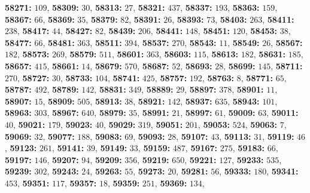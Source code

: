 \textsf{\bfseries 58271:} $109$, \textsf{\bfseries 58309:} $30$, \textsf{\bfseries 58313:} $27$, \textsf{\bfseries 58321:} $437$, \textsf{\bfseries 58337:} $193$, \textsf{\bfseries 58363:} $159$, \textsf{\bfseries 58367:} $66$, \textsf{\bfseries 58369:} $35$, \textsf{\bfseries 58379:} $82$, \textsf{\bfseries 58391:} $26$, \textsf{\bfseries 58393:} $73$, \textsf{\bfseries 58403:} $263$, \textsf{\bfseries 58411:} $238$, \textsf{\bfseries 58417:} $44$, \textsf{\bfseries 58427:} $82$, \textsf{\bfseries 58439:} $206$, \textsf{\bfseries 58441:} $148$, \textsf{\bfseries 58451:} $120$, \textsf{\bfseries 58453:} $38$, \textsf{\bfseries 58477:} $66$, \textsf{\bfseries 58481:} $363$, \textsf{\bfseries 58511:} $394$, \textsf{\bfseries 58537:} $270$, \textsf{\bfseries 58543:} $11$, \textsf{\bfseries 58549:} $26$, \textsf{\bfseries 58567:} $182$, \textsf{\bfseries 58573:} $269$, \textsf{\bfseries 58579:} $511$, \textsf{\bfseries 58601:} $363$, \textsf{\bfseries 58603:} $115$, \textsf{\bfseries 58613:} $182$, \textsf{\bfseries 58631:} $185$, \textsf{\bfseries 58657:} $415$, \textsf{\bfseries 58661:} $14$, \textsf{\bfseries 58679:} $570$, \textsf{\bfseries 58687:} $52$, \textsf{\bfseries 58693:} $28$, \textsf{\bfseries 58699:} $145$, \textsf{\bfseries 58711:} $270$, \textsf{\bfseries 58727:} $30$, \textsf{\bfseries 58733:} $104$, \textsf{\bfseries 58741:} $425$, \textsf{\bfseries 58757:} $192$, \textsf{\bfseries 58763:} $8$, \textsf{\bfseries 58771:} $65$, \textsf{\bfseries 58787:} $492$, \textsf{\bfseries 58789:} $142$, \textsf{\bfseries 58831:} $349$, \textsf{\bfseries 58889:} $29$, \textsf{\bfseries 58897:} $378$, \textsf{\bfseries 58901:} $11$, \textsf{\bfseries 58907:} $15$, \textsf{\bfseries 58909:} $505$, \textsf{\bfseries 58913:} $38$, \textsf{\bfseries 58921:} $142$, \textsf{\bfseries 58937:} $635$, \textsf{\bfseries 58943:} $101$, \textsf{\bfseries 58963:} $303$, \textsf{\bfseries 58967:} $640$, \textsf{\bfseries 58979:} $35$, \textsf{\bfseries 58991:} $21$, \textsf{\bfseries 58997:} $61$, \textsf{\bfseries 59009:} $63$, \textsf{\bfseries 59011:} $40$, \textsf{\bfseries 59021:} $179$, \textsf{\bfseries 59023:} $40$, \textsf{\bfseries 59029:} $319$, \textsf{\bfseries 59051:} $201$, \textsf{\bfseries 59053:} $524$, \textsf{\bfseries 59063:} $7$, \textsf{\bfseries 59069:} $32$, \textsf{\bfseries 59077:} $188$, \textsf{\bfseries 59083:} $69$, \textsf{\bfseries 59093:} $28$, \textsf{\bfseries 59107:} $43$, \textsf{\bfseries 59113:} $31$, \textsf{\bfseries 59119:} $46$, \textsf{\bfseries 59123:} $261$, \textsf{\bfseries 59141:} $39$, \textsf{\bfseries 59149:} $33$, \textsf{\bfseries 59159:} $487$, \textsf{\bfseries 59167:} $275$, \textsf{\bfseries 59183:} $66$, \textsf{\bfseries 59197:} $146$, \textsf{\bfseries 59207:} $94$, \textsf{\bfseries 59209:} $356$, \textsf{\bfseries 59219:} $650$, \textsf{\bfseries 59221:} $127$, \textsf{\bfseries 59233:} $535$, \textsf{\bfseries 59239:} $302$, \textsf{\bfseries 59243:} $24$, \textsf{\bfseries 59263:} $55$, \textsf{\bfseries 59273:} $20$, \textsf{\bfseries 59281:} $56$, \textsf{\bfseries 59333:} $180$, \textsf{\bfseries 59341:} $453$, \textsf{\bfseries 59351:} $117$, \textsf{\bfseries 59357:} $18$, \textsf{\bfseries 59359:} $251$, \textsf{\bfseries 59369:} $134$, 
